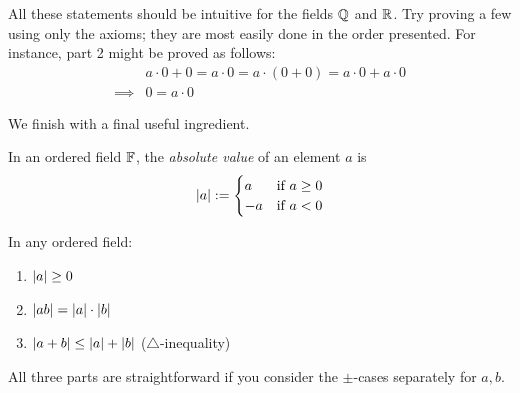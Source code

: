 All these statements should be intuitive for the fields $\mathbb{Q}$ and $\mathbb{R}$. Try proving a few using only the axioms; they are most easily done in the order presented. For instance, part 2 might be proved as follows:
\begin{align*}
	&a\cdot 0+0=a\cdot 0=a\cdot(0+0)=a\cdot 0+a\cdot 0 \tag{additive identity/distibutive axioms}\\
	\implies &0=a\cdot 0 \tag{part 1}
\end{align*}

We finish with a final useful ingredient.

\begin{defn}{}{}
	In an ordered field $\mathbb{F}$, the \emph{absolute value} of an element $a$ is
	\[
		\left| a\right|:=
		\begin{cases}
			a&\text{if }a\ge 0\\
			-a&\text{if }a<0
		\end{cases}
	\]
\end{defn}

\begin{thm}{}{}
	In any ordered field:
	\begin{enumerate}
	\item $\left| a\right|\ge 0$
	\item $\left| ab\right|=\left| a\right|\cdot \left| b\right|$
	\item $\left| a+b\right|\le \left| a\right|+\left| b\right|$ \lstsp ($\triangle$-inequality)
	\end{enumerate}
\end{thm}

All three parts are straightforward if you consider the $\pm$-cases separately for $a,b$.


